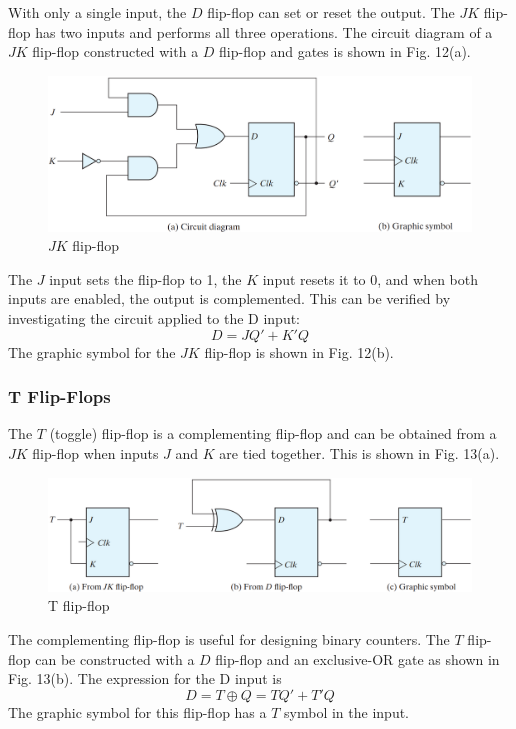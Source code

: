 With only a single input, the $D$ flip-flop can set or reset the output. The $JK$ flip-flop has two inputs and performs all three operations. The circuit diagram of a $JK$ flip-flop constructed with a $D$ flip-flop 
and gates is shown in Fig. 12(a).
\begin{figure}[H]
  \centering
  \includegraphics[width=\linewidth]{img/fig-5.12.png}
  \caption{$JK$ flip-flop}
  \label{fig:5.12}
\end{figure}
\noindent The $J$ input sets the flip-flop to 1, the $K$ input resets it 
to 0, and when both inputs are enabled, the output is complemented. This can be verified by investigating the circuit applied to the D input:
\begin{equation*}
  D = JQ' + K'Q
\end{equation*}
The graphic symbol for the $JK$ flip-flop is shown in Fig. 12(b).

\vspace*{\fill}
\columnbreak

\subsubsection{T Flip-Flops}
\label{subsubsec:t-flip-flops}

The $T$ (toggle) flip-flop is a complementing flip-flop and can be obtained from a $JK$ flip-flop when inputs $J$ and $K$ are tied together. This is shown in Fig. 13(a).
\begin{figure}[H]
  \centering
  \includegraphics[width=\linewidth]{img/fig-5.13.png}
  \caption{T flip-flop}
  \label{fig:5.13}
\end{figure}
The complementing flip-flop is useful for designing binary counters. The $T$ flip-flop can be constructed with a $D$ flip-flop and an exclusive-OR gate as shown in Fig. 13(b). The expression for the D input is
\begin{equation*}
  D = T \oplus Q = TQ' + T'Q
\end{equation*}
The graphic symbol for this flip-flop has a $T$ symbol in the input.



